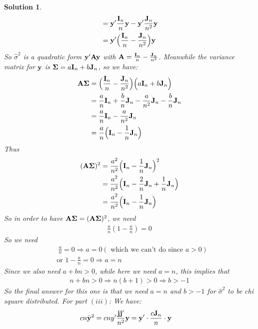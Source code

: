 \documentclass[11pt]{article}
\newtheorem{sol}{Solution}
\begin{document}
\begin{sol}
\begin{align*}
		&= {\bf y}'\frac{{\bf I}_n}{n}{\bf y} - {\bf y}'\frac{{\bf J}_n}{n^2}{\bf y}\\
		&= {\bf y}'\Big(\frac{{\bf I}_n}{n} - \frac{{\bf J}_n}{n^2}\Big){\bf y}
	\end{align*}
	So $\hat{\sigma}^2$ is a quadratic form ${\bf y}'{\bf A}{\bf y}$ with ${\bf A} = \frac{{\bf I}_n}{n} - \frac{{\bf J}_n}{n^2}$. Meanwhile the variance matrix for ${\bf y}$ is ${\bf \Sigma} = a{\bf I}_n + b{\bf J}_n$, so we have:
	\begin{align*}
		{\bf A}{\bf \Sigma} &= \Big(\frac{{\bf I}_n}{n} - \frac{{\bf J}_n}{n^2}\Big)\Big(a {\bf I}_n + b{\bf J}_n\Big)\\
		&= \frac{a}{n}{\bf I}_n +\frac{b}{n}{\bf J}_n - \frac{a}{n^2}{\bf J}_n - \frac{b}{n}{\bf J}_n\\
		&= \frac{a}{n}{\bf I}_n - \frac{a}{n^2}{\bf J}_n\\
		&= \frac{a}{n}\Big({\bf I}_n - \frac{1}{n}{\bf J}_n\Big)
	\end{align*}
	Thus 
	\begin{align*}
		({\bf A}{\bf \Sigma})^2 &= \frac{a^2}{n^2}\Big({\bf I}_n - \frac{1}{n}{\bf J}_n\Big)^2\\
		&= \frac{a^2}{n^2}\Big({\bf I}_n - \frac{2}{n}{\bf J}_n + \frac{1}{n}{\bf J}_n\Big)\\
		&= \frac{a^2}{n^2}\Big({\bf I}_n - \frac{1}{n}{\bf J}_n\Big)
	\end{align*}
	So in order to have ${\bf A}{\bf \Sigma} = ({\bf A}{\bf \Sigma})^2$, we need
	\begin{align*}
		\frac{a}{n}(1 - \frac{a}{n}) = 0
	\end{align*}
	So we need
	\begin{align*}
		&\ \frac{a}{n} = 0 \Longrightarrow a = 0 (\text{ which we can't do since } a > 0)\\
		&\text{or } 1 - \frac{a}{n} = 0 \Longrightarrow a = n
	\end{align*}
	Since we also need $a + bn >0$, while here we need $a = n$, this implies that
	\begin{align*}
		n + bn > 0 \Longrightarrow n(b+ 1) > 0 \Longrightarrow b > -1
	\end{align*}
	So the final answer for this one is that we need $a  = n$ and $b >-1$ for $\hat{\sigma}^2$ to be chi square distributed.\vskip 2mm
	For part $(iii)$:\vskip 2mm
	We have:
	\begin{align*}
		cn\bar{{\bf y}}^2 &= cn y'\frac{{\bf j}{\bf j}'}{n^2}{\bf y} = {\bf y}' \cdot \frac{c{\bf J}_n}{n}\cdot {\bf y}
	\end{align*}

\end{sol}
\end{document}
